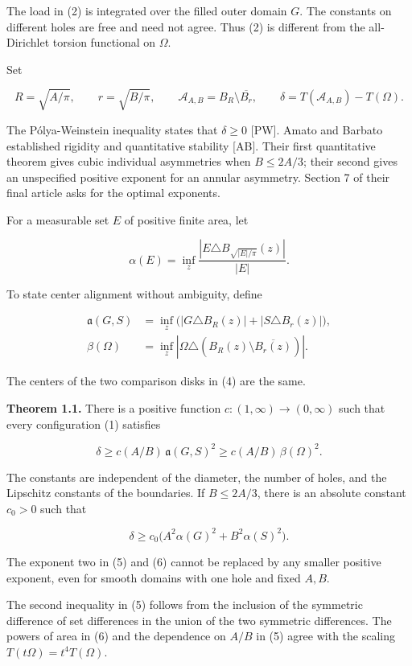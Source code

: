 \documentclass[11pt]{article}
\begin{document}
The load in (2) is integrated over the filled outer domain \(G\). The
constants on different holes are free and need not agree. Thus (2) is
different from the all-Dirichlet torsion functional on \(\Omega\).

Set

\[
R=\sqrt{A/\pi},\qquad r=\sqrt{B/\pi},\qquad
\mathcal A_{A,B}=B_R\setminus\overline{B_r},\qquad
\delta=T(\mathcal A_{A,B})-T(\Omega).
\tag{3}
\]

The Pólya-Weinstein inequality states that \(\delta\ge0\) {[}PW{]}.
Amato and Barbato established rigidity and quantitative stability
{[}AB{]}. Their first quantitative theorem gives cubic individual
asymmetries when \(B\le2A/3\); their second gives an unspecified
positive exponent for an annular asymmetry. Section 7 of their final
article asks for the optimal exponents.

For a measurable set \(E\) of positive finite area, let

\[
\alpha(E)=\inf_z\frac{|E\triangle B_{\sqrt{|E|/\pi}}(z)|}{|E|}.
\]

To state center alignment without ambiguity, define

\[
\begin{aligned}
\mathfrak a(G,S)&=\inf_z\bigl(|G\triangle B_R(z)|+|S\triangle B_r(z)|\bigr),\\
\beta(\Omega)&=\inf_z|\Omega\triangle(B_R(z)\setminus\overline{B_r(z)})|.
\end{aligned}
\tag{4}
\]

The centers of the two comparison disks in (4) are the same.

\textbf{Theorem 1.1.} There is a positive function
\(c:(1,\infty)\to(0,\infty)\) such that every configuration (1)
satisfies

\[
\delta\ge c(A/B)\,\mathfrak a(G,S)^2
\ge c(A/B)\,\beta(\Omega)^2.
\tag{5}
\]

The constants are independent of the diameter, the number of holes, and
the Lipschitz constants of the boundaries. If \(B\le2A/3\), there is an
absolute constant \(c_0>0\) such that

\[
\delta\ge c_0\bigl(A^2\alpha(G)^2+B^2\alpha(S)^2\bigr).
\tag{6}
\]

The exponent two in (5) and (6) cannot be replaced by any smaller
positive exponent, even for smooth domains with one hole and fixed
\(A,B\).

The second inequality in (5) follows from the inclusion of the symmetric
difference of set differences in the union of the two symmetric
differences. The powers of area in (6) and the dependence on \(A/B\) in
(5) agree with the scaling \(T(t\Omega)=t^4T(\Omega)\).
\end{document}
